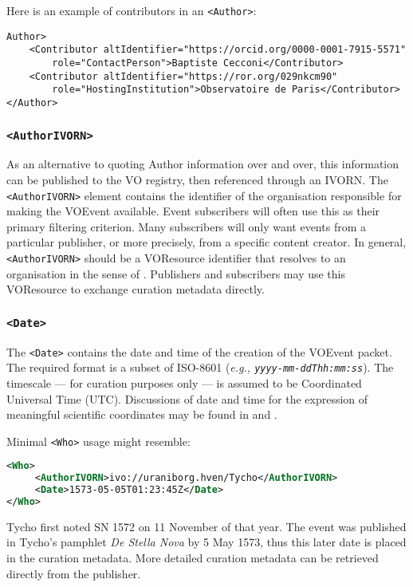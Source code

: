 \documentclass[11pt,a4paper]{ivoa}
\begin{document}
Here is an example of contributors in an \verb|<Author>|:
\begin{lstlisting}
Author>
	<Contributor altIdentifier="https://orcid.org/0000-0001-7915-5571"
	    role="ContactPerson">Baptiste Cecconi</Contributor>
	<Contributor altIdentifier="https://ror.org/029nkcm90"
	    role="HostingInstitution">Observatoire de Paris</Contributor>
</Author>
\end{lstlisting}

\subsubsection{\texttt{<AuthorIVORN>}}
As an alternative to quoting Author information over and over, this information
can be published to the VO registry, then referenced through an IVORN.
The \verb|<AuthorIVORN>| element contains the identifier of the organisation responsible
for making the VOEvent available. Event subscribers will often use this as their
primary filtering criterion. Many subscribers will only want events from a
particular publisher, or more precisely, from a specific content creator. In
general, \verb|<AuthorIVORN>| should be a VOResource identifier that resolves to
an organisation in the sense of \citep{2007ivoa.spec.0302H}. Publishers and
subscribers may use this VOResource to exchange curation metadata directly.

\subsubsection{\texttt{<Date>}}
The \verb|<Date>| contains the date and time of the creation of the VOEvent
packet. The required format is a subset of ISO-8601 (\emph{e.g.,
\texttt{yyyy-mm-ddThh:mm:ss}}). The timescale --- for curation purposes only --- is
assumed to be Coordinated Universal Time (UTC). Discussions of date and time for
the expression of meaningful scientific coordinates may be found in
\citep{2007ivoa.spec.1030R} and \citep{bib26}.


Minimal \verb|<Who>| usage might resemble:
\begin{lstlisting}[language=XML]
<Who>
     <AuthorIVORN>ivo://uraniborg.hven/Tycho</AuthorIVORN>
     <Date>1573-05-05T01:23:45Z</Date>
</Who>
\end{lstlisting}
Tycho first noted SN 1572 on 11 November of that year. The event was published
in Tycho's pamphlet \emph{De Stella Nova} by 5 May 1573, thus this later date is
placed in the curation metadata. More detailed curation metadata can be
retrieved directly from the publisher.
\end{document}
